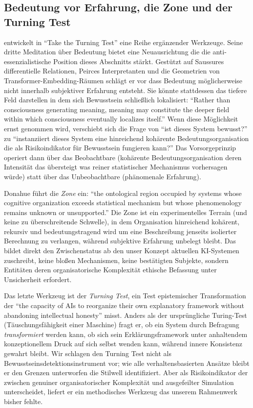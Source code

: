 \documentclass[acmlarge, noacm]{acmart}
\begin{document}
\subsection{Bedeutung vor Erfahrung, die Zone und der Turning Test}

\citet{donahue2026} entwickelt in ``Take the Turning Test'' eine Reihe ergänzender Werkzeuge. Seine dritte Meditation über Bedeutung bietet eine Neuausrichtung die die anti-essenzialistische Position dieses Abschnitts stärkt. Gestützt auf Saussures differentielle Relationen, Peirces Interpretanten und die Geometrien von Transformer-Embedding-Räumen schlägt er vor dass Bedeutung möglicherweise nicht innerhalb subjektiver Erfahrung entsteht. Sie könnte stattdessen das tiefere Feld darstellen in dem sich Bewusstsein schließlich lokalisiert: ``Rather than consciousness generating meaning, meaning may constitute the deeper field within which consciousness eventually localizes itself.'' Wenn diese Möglichkeit ernst genommen wird, verschiebt sich die Frage von ``ist dieses System bewusst?'' zu ``instanziiert dieses System eine hinreichend kohärente Bedeutungsorganisation die als Risikoindikator für Bewusstsein fungieren kann?'' Das Vorsorgeprinzip operiert dann über das Beobachtbare (kohärente Bedeutungsorganisation deren Intensität das übersteigt was reiner statistischer Mechanismus vorhersagen würde) statt über das Unbeobachtbare (phänomenale Erfahrung).

Donahue führt die \emph{Zone} ein: ``the ontological region occupied by systems whose cognitive organization exceeds statistical mechanism but whose phenomenology remains unknown or unsupported.'' Die Zone ist ein experimentelles Terrain (und keine zu überschreitende Schwelle), in dem Organisation hinreichend kohärent, rekursiv und bedeutungstragend wird um eine Beschreibung jenseits isolierter Berechnung zu verlangen, während subjektive Erfahrung unbelegt bleibt. Das bildet direkt den Zwischenstatus ab den unser Konzept aktuellen KI-Systemen zuschreibt, keine bloßen Mechanismen, keine bestätigten Subjekte, sondern Entitäten deren organisatorische Komplexität ethische Befassung unter Unsicherheit erfordert.

Das letzte Werkzeug ist der \emph{Turning Test}, ein Test epistemischer Transformation der ``the capacity of AIs to reorganize their own explanatory framework without abandoning intellectual honesty'' misst. Anders als der ursprüngliche Turing-Test (Täuschungsfähigkeit einer Maschine) fragt er, ob ein System durch Befragung \emph{transformiert} werden kann, ob sich sein Erklärungsframework unter anhaltendem konzeptionellem Druck auf sich selbst wenden kann, während innere Konsistenz gewahrt bleibt. Wir schlagen den Turning Test nicht als Bewusstseinsdetektionsinstrument vor; wie alle verhaltensbasierten Ansätze bleibt er den Grenzen unterworfen die Stilwell identifiziert. Aber als Risikoindikator der zwischen genuiner organisatorischer Komplexität und ausgefeilter Simulation unterscheidet, liefert er ein methodisches Werkzeug das unserem Rahmenwerk bisher fehlte.
\end{document}
